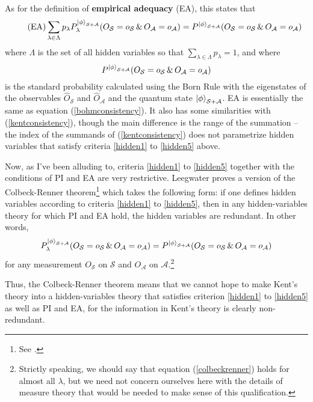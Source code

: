 As for the definition of \textbf{empirical adequacy} (EA),  this states that
\begin{equation}\tag{EA}\label{adeq}
	\sum_{\lambda\in\Lambda}p_\lambda P_\lambda^{\ket{\phi}_{\mathcal{S}+\mathcal{A}}}(O_\mathcal{S}=o_\mathcal{S}\, \& \,O_\mathcal{A}=o_\mathcal{A})=P^{\ket{\phi}_{\mathcal{S}+\mathcal{A}}}(O_\mathcal{S}=o_\mathcal{S}\, \& \,O_\mathcal{A}=o_\mathcal{A})
\end{equation}
where $\Lambda$ is the set of all hidden variables so that $\sum_{\lambda\in\Lambda} p_\lambda = 1$, and where 
$$P^{\ket{\phi}_{\mathcal{S}+\mathcal{A}}}(O_\mathcal{S}=o_\mathcal{S}\, \& \,O_\mathcal{A}=o_\mathcal{A})$$
 is the standard probability calculated using the Born Rule with the eigenstates of the observables $\hat{O}_\mathcal{S}$ and $\hat{O}_\mathcal{A}$ and the quantum state $\ket{\phi}_{\mathcal{S}+\mathcal{A}}$. EA is essentially the same as equation (\ref{bohmconsistency}). It also has some similarities with (\ref{kentconsistency}), though the main difference is the range of the summation -- the index of the summands of (\ref{kentconsistency}) does not parametrize hidden variables that satisfy criteria \ref{hidden1} to \ref{hidden5} above.

Now, as I've been alluding to, criteria \ref{hidden1} to \ref{hidden5} together with the conditions of PI and EA are very restrictive. Leegwater proves a version of the Colbeck-Renner theorem\footnote{See \cite{LeegwaterGijs2016Aitf}.} which takes the following form: if one defines hidden variables according to criteria \ref{hidden1} to \ref{hidden5}, then in any hidden-variables theory for which PI and EA hold, the hidden variables are redundant. In other words, 
\begin{equation}\label{colbeckrenner}
P_\lambda^{\ket{\phi}_{\mathcal{S}+\mathcal{A}}}(O_\mathcal{S}=o_\mathcal{S}\, \& \,O_\mathcal{A}=o_\mathcal{A})=P^{\ket{\phi}_{\mathcal{S}+\mathcal{A}}}(O_\mathcal{S}=o_\mathcal{S}\, \& \,O_\mathcal{A}=o_\mathcal{A})
\end{equation}
for any measurement $O_\mathcal{S}$ on $\mathcal{S}$ and $O_\mathcal{A}$ on $\mathcal{A}$.\footnote{Strictly speaking, we should say that equation (\ref{colbeckrenner}) holds for almost all $\lambda$, but we need not concern ourselves here with the details of measure theory that would be needed to make sense of this qualification.} 

Thus, the Colbeck-Renner theorem means that we cannot hope to make Kent's theory into a hidden-variables theory that satisfies criterion \ref{hidden1} to \ref{hidden5} as well as  PI and EA, for the information in Kent's theory is clearly non-redundant.

